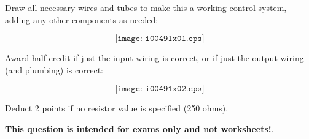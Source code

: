 

Draw all necessary wires and tubes to make this a working control system, adding any other components as needed:

$$\texttt{[image: i00491x01.eps]}$$







Award half-credit if just the input wiring is correct, or if just the output wiring (and plumbing) is correct:

$$\texttt{[image: i00491x02.eps]}$$

Deduct 2 points if no resistor value is specified (250 ohms).







{\bf This question is intended for exams only and not worksheets!}.



